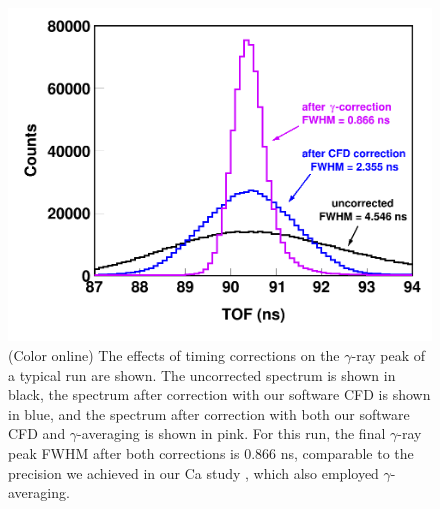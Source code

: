 \documentclass[twocolumn,secnumarabic,amssymb, nobibnotes, aps, prl,
superscriptaddress, nobalancelastpage]{revtex4}
\begin{document}
\begin{figure}
    \includegraphics[scale=0.24]{figures/TimeCorrections.png}
    \caption{(Color online) The effects of timing corrections on the $\gamma$-ray
        peak of a typical run are shown. The uncorrected spectrum is shown in black,
        the spectrum after correction with our software CFD is shown in blue,
        and the spectrum after correction with both our software CFD and
        $\gamma$-averaging is 
        shown in pink. For this run, the final $\gamma$-ray peak 
        FWHM after both corrections is 0.866 ns, comparable to the precision we
        achieved in our Ca study \cite{Shane2010}, which also employed $\gamma$-
        averaging.
        }
    \label{TimingCorrectionStudy}
\end{figure}
\end{document}

